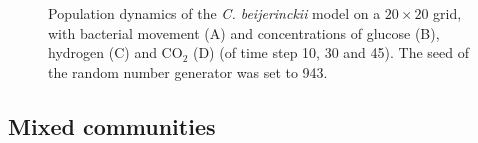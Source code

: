 \begin{figure}[h!]
{\begin{minipage}[t]{0.3\textwidth}
  \end{minipage}
  }
  \caption{Population dynamics of the \emph{C. beijerinckii} model on a $20\times20$ grid, with bacterial movement (A) and concentrations of glucose (B), hydrogen (C) and CO$_2$ (D) (of time step 10, 30 and 45). The seed of the random number generator was set to 943.}
  \label{fig:beijergrids}
\end{figure}

\subsection{Mixed communities}
